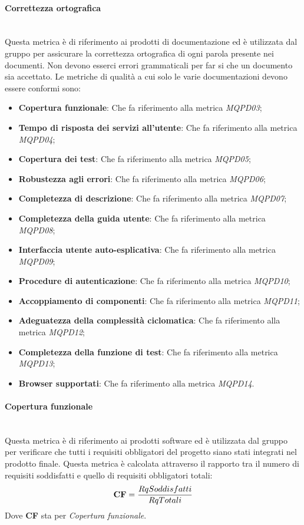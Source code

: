 \paragraph{Correttezza ortografica}\mbox{}\\
Questa metrica è di riferimento ai prodotti di documentazione ed è utilizzata dal gruppo per assicurare la correttezza ortografica di ogni parola presente nei documenti. Non devono esserci errori grammaticali per far si che un documento sia accettato.
Le metriche di qualità a cui solo le varie documentazioni devono essere conformi sono:
\begin{itemize}
	\item \textbf{Copertura funzionale}: Che fa riferimento alla metrica \textit{MQPD03};
	\item \textbf{Tempo di risposta dei servizi all'utente}: Che fa riferimento alla metrica \textit{MQPD04}; 
	\item \textbf{Copertura dei test}: Che fa riferimento alla metrica \textit{MQPD05}; 
	\item \textbf{Robustezza agli errori}: Che fa riferimento alla metrica \textit{MQPD06};
	\item \textbf{Completezza di descrizione}: Che fa riferimento alla metrica \textit{MQPD07};
	\item \textbf{Completezza della guida utente}: Che fa riferimento alla metrica \textit{MQPD08};
	\item \textbf{Interfaccia utente auto-esplicativa}: Che fa riferimento alla metrica \textit{MQPD09};
	\item \textbf{Procedure di autenticazione}: Che fa riferimento alla metrica \textit{MQPD10};
	\item \textbf{Accoppiamento di componenti}: Che fa riferimento alla metrica \textit{MQPD11};
	\item \textbf{Adeguatezza della complessità ciclomatica}: Che fa riferimento alla metrica \textit{MQPD12};
	\item \textbf{Completezza della funzione di test}: Che fa riferimento alla metrica \textit{MQPD13};
	\item \textbf{Browser supportati}: Che fa riferimento alla metrica \textit{MQPD14}.
\end{itemize}
\paragraph{Copertura funzionale}\mbox{}\\
Questa metrica è di riferimento ai prodotti software ed è utilizzata dal gruppo per verificare che tutti i requisiti obbligatori del progetto siano stati integrati nel prodotto finale. Questa metrica è calcolata attraverso il rapporto tra il numero di requisiti soddisfatti e quello di requisiti obbligatori totali:
\begin{align*}
	\centering
	\textbf{CF} = \frac{RqSoddisfatti}{RqTotali}
\end{align*}
Dove \textbf{CF} sta per \textit{Copertura funzionale}.
